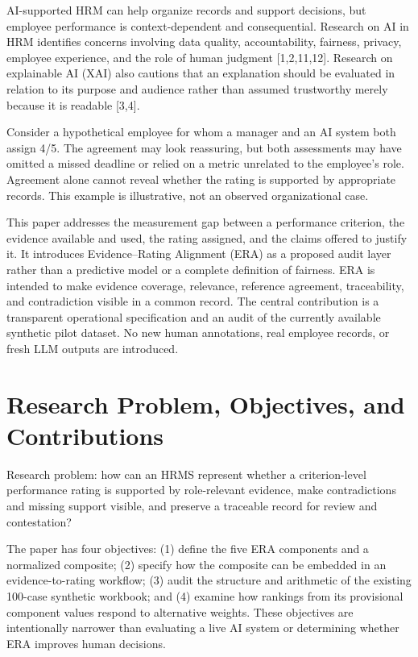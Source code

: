 \documentclass[
  10pt,
  runningheads]{llncs}
\begin{document}
AI-supported HRM can help organize records and support decisions, but
employee performance is context-dependent and consequential. Research on
AI in HRM identifies concerns involving data quality, accountability,
fairness, privacy, employee experience, and the role of human judgment
{[}1,2,11,12{]}. Research on explainable AI (XAI) also cautions that an
explanation should be evaluated in relation to its purpose and audience
rather than assumed trustworthy merely because it is readable {[}3,4{]}.

Consider a hypothetical employee for whom a manager and an AI system
both assign 4/5. The agreement may look reassuring, but both assessments
may have omitted a missed deadline or relied on a metric unrelated to
the employee's role. Agreement alone cannot reveal whether the rating is
supported by appropriate records. This example is illustrative, not an
observed organizational case.

This paper addresses the measurement gap between a performance
criterion, the evidence available and used, the rating assigned, and the
claims offered to justify it. It introduces Evidence--Rating Alignment
(ERA) as a proposed audit layer rather than a predictive model or a
complete definition of fairness. ERA is intended to make evidence
coverage, relevance, reference agreement, traceability, and
contradiction visible in a common record. The central contribution is a
transparent operational specification and an audit of the currently
available synthetic pilot dataset. No new human annotations, real
employee records, or fresh LLM outputs are introduced.

\section{Research Problem, Objectives, and
Contributions}\label{research-problem-objectives-and-contributions}

Research problem: how can an HRMS represent whether a criterion-level
performance rating is supported by role-relevant evidence, make
contradictions and missing support visible, and preserve a traceable
record for review and contestation?

The paper has four objectives: (1) define the five ERA components and a
normalized composite; (2) specify how the composite can be embedded in
an evidence-to-rating workflow; (3) audit the structure and arithmetic
of the existing 100-case synthetic workbook; and (4) examine how
rankings from its provisional component values respond to alternative
weights. These objectives are intentionally narrower than evaluating a
live AI system or determining whether ERA improves human decisions.
\end{document}
